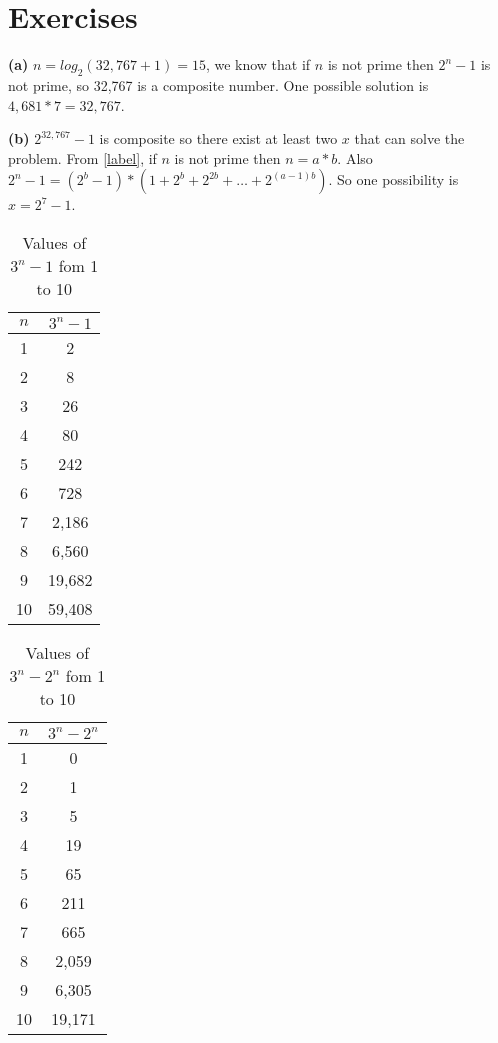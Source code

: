 \section{Exercises}


\sol \textbf{(a)} $n = log_2(32,767+1) = 15$, we know that if $n$ is not prime then $2^n - 1$ is not prime, so 32,767 is a composite number. 
One possible solution is $4,681 * 7 = 32,767$.

\sol \textbf{(b)} $2^{32,767} - 1$ is composite so there exist at least two $x$ that can solve the problem.
From \ref{label}, if $n$ is not prime then $n = a*b$.
Also $2^n - 1 = (2^b - 1) * (1 + 2^b + 2^{2b} + \ldots + 2^{(a-1)b})$.
So one possibility is $x = 2^7 - 1$.


\sol \begin{table}[h]
  \centering
  \label{tab:3n_minus_1}
  \begin{tabular}{|c|c|}
    \hline
    $n$ & $3^n - 1$\\
    \hline
    1 & 2\\
    2 & 8\\
    3 & 26\\
    4 & 80\\
    5 & 242\\
    6 & 728\\
    7 & 2,186\\
    8 & 6,560\\
    9 & 19,682\\
    10 & 59,408\\
    \hline
  \end{tabular}
  \caption{Values of $3^n - 1$ fom 1 to 10}
\end{table}


\begin{table}[h]
  \centering
  \label{tab:3n_minus_2n}
  \begin{tabular}{|c|c|}
    \hline
    $n$ & $3^n - 2^n$\\
    \hline
    1 & 0\\
    2 & 1\\
    3 & 5\\
    4 & 19\\
    5 & 65\\
    6 & 211\\
    7 & 665\\
    8 & 2,059\\
    9 & 6,305\\
    10 & 19,171\\
    \hline
  \end{tabular}
  \caption{Values of $3^n - 2^n$ fom 1 to 10}
\end{table}

